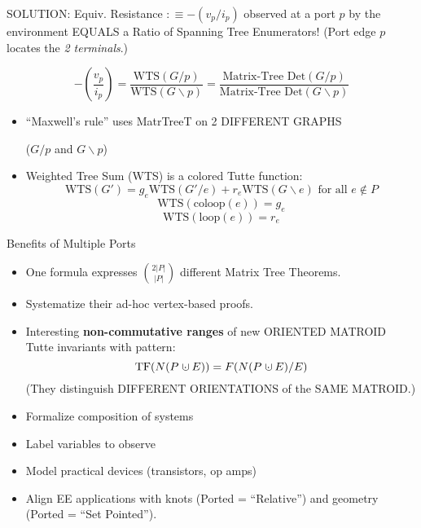\documentclass{beamer}
\newcommand{\dunion}
{\mbox{\hbox{\hskip0.45em$\cdot$\hskip-0.44em$\cup$\hskip0.2em}}}
\begin{document}
\begin{frame}{SOLUTION: Equiv. Resistance $ :\equiv -(v_p/i_p)$
observed at a port $p$ by the environment
EQUALS a Ratio of Spanning Tree Enumerators!
(Port edge $p$ locates the \textit{2 terminals}.)}

\[
-(\frac{v_p}{i_p})=\frac{\mbox{WTS}(G/p)}
{\mbox{WTS}(G\backslash p)} 
= \frac{\mbox{Matrix-Tree Det}(G/p)}
       {\mbox{Matrix-Tree Det}(G\backslash p)}
\]
\begin{itemize}
\item
``Maxwell's rule'' uses MatrTreeT on 2 DIFFERENT GRAPHS\\
\begin{center}($G/p$ and $G\backslash p$)\end{center}
\item
Weighted Tree Sum (WTS) is a colored Tutte function:
\[
\mbox{WTS}(G') =
g_e \mbox{WTS}(G'/e) + r_e \mbox{WTS} (G \backslash e)
\text{\ for all\ }e \not\in P
\]
\[
\mbox{WTS}(\text{coloop}(e)) = g_e
\]
\[
\mbox{WTS}(\text{loop}(e)) = r_e
\]
\end{itemize}
\end{frame}

\begin{frame}{Benefits of Multiple Ports}

\begin{itemize}
\item One formula expresses $\binom{2|P|}{|P|}$ different Matrix Tree Theorems.
\item
Systematize their ad-hoc vertex-based proofs.
\item
Interesting \textbf{non-commutative ranges} of
new ORIENTED MATROID Tutte invariants with pattern:
\[
\text{TF}(N(P\dunion E)) = F(N(P\dunion E)/E)
\]
(They distinguish DIFFERENT ORIENTATIONS of the SAME MATROID.)
\item
Formalize composition of systems\cite{NarayananDecompVS1986}
\item
Label variables to observe
\item
Model practical devices (transistors, op amps)
\item 
Align EE applications with knots (Ported = ``Relative'')
and geometry (Ported = ``Set Pointed'').  
\end{itemize}
\end{frame}
\end{document}
